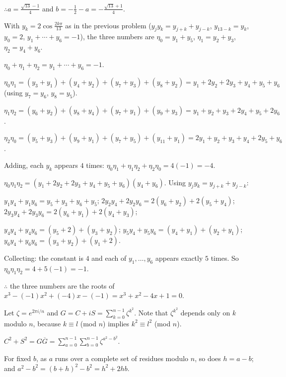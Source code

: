   $\therefore a = \frac{\sqrt{13} - 1}{4}$ and $b = -\frac{1}{2} - a = -\frac{\sqrt{13} + 1}{4}$.
\item With $y_k = 2\cos\frac{2k\pi}{13}$ as in the previous problem ($y_jy_k = y_{j + k} + y_{j - k}$, $y_{13 -
    k} = y_k$, $y_0 = 2$, $y_1 + \cdots + y_6 = -1$), the three numbers are $\eta_0 = y_1 + y_5$, $\eta_1 = y_2 +
  y_3$, $\eta_2 = y_4 + y_6$.

  $\eta_0 + \eta_1 + \eta_2 = y_1 + \cdots + y_6 = -1$.

  $\eta_0\eta_1 = (y_3 + y_1) + (y_4 + y_2) + (y_7 + y_3) + (y_8 + y_2) = y_1 + 2y_2 + 2y_3 + y_4 + y_5 + y_6$ (using
  $y_7 = y_6$, $y_8 = y_5$).

  $\eta_1\eta_2 = (y_6 + y_2) + (y_8 + y_4) + (y_7 + y_1) + (y_9 + y_3) = y_1 + y_2 + y_3 + 2y_4 + y_5 + 2y_6$.

  $\eta_2\eta_0 = (y_5 + y_3) + (y_9 + y_1) + (y_7 + y_5) + (y_{11} + y_1) = 2y_1 + y_2 + y_3 + y_4 + 2y_5 + y_6$.

  Adding, each $y_k$ appears $4$ times: $\eta_0\eta_1 + \eta_1\eta_2 + \eta_2\eta_0 = 4(-1) = -4$.

  $\eta_0\eta_1\eta_2 = (y_1 + 2y_2 + 2y_3 + y_4 + y_5 + y_6)(y_4 + y_6)$. Using $y_jy_k = y_{j + k} + y_{j - k}$:

  $y_1y_4 + y_1y_6 = y_5 + y_3 + y_6 + y_5$; $2y_2y_4 + 2y_2y_6 = 2(y_6 + y_2) + 2(y_5 + y_4)$; $2y_3y_4 + 2y_3y_6 =
  2(y_6 + y_1) + 2(y_4 + y_3)$;

  $y_4y_4 + y_4y_6 = (y_5 + 2) + (y_3 + y_2)$; $y_5y_4 + y_5y_6 = (y_4 + y_1) + (y_2 + y_1)$; $y_6y_4 + y_6y_6 = (y_3
  + y_2) + (y_1 + 2)$.

  Collecting: the constant is $4$ and each of $y_1, \ldots, y_6$ appears exactly $5$ times. So
  $\eta_0\eta_1\eta_2 = 4 + 5(-1) = -1$.

  $\therefore$ the three numbers are the roots of $x^3 - (-1)x^2 + (-4)x - (-1) = x^3 + x^2 - 4x + 1 = 0$.
\item Let $\zeta = e^{2\pi i/n}$ and $G = C + iS = \displaystyle\sum_{k = 0}^{n - 1}\zeta^{k^2}$. Note that
  $\zeta^{k^2}$ depends only on $k$ modulo $n$, because $k\equiv l$ (mod $n$) implies $k^2\equiv l^2$ (mod $n$).

  $C^2 + S^2 = G\overline{G} = \displaystyle\sum_{a = 0}^{n - 1}\sum_{b = 0}^{n - 1}\zeta^{a^2 - b^2}$.

  For fixed $b$, as $a$ runs over a complete set of residues modulo $n$, so does $h = a - b$; and $a^2 - b^2 = (b +
  h)^2 - b^2 = h^2 + 2hb$.

